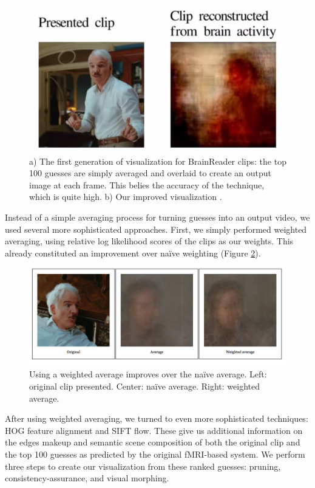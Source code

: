 \begin{figure}[t]
\centering
    \includegraphics[width=1.0\columnwidth]{figures/average.png}
\caption{a) The first generation of visualization for BrainReader clips: the top 100 guesses are simply averaged and overlaid to create an output image at each frame.  This belies the accuracy of the technique, which is quite high. b) Our improved visualization .}
\label{fig:avg}
\end{figure}


Instead of a simple averaging process for turning guesses into an output video, we used several more sophisticated approaches.  First, we simply performed weighted averaging, using relative log likelihood scores of the clips as our weights.  This already constituted an improvement over na\"{i}ve weighting (Figure \ref{fig:weighted}).

\begin{figure}[t]
\centering
    \includegraphics[width=1.0\columnwidth]{figures/orig-avg-weighted.png}
\caption{Using a weighted average improves over the na\"{i}ve average.  Left: original clip presented.  Center: na\"{i}ve average.  Right: weighted average.}
\label{fig:weighted}
\end{figure}


After using weighted averaging, we turned to even more sophisticated techniques: HOG feature alignment and SIFT flow.  These give us additional information on the edges makeup and semantic scene composition of both the original clip and the top 100 guesses as predicted by the original fMRI-based system.  We perform three steps to create our visualization from these ranked guesses: pruning, consistency-assurance, and visual morphing.